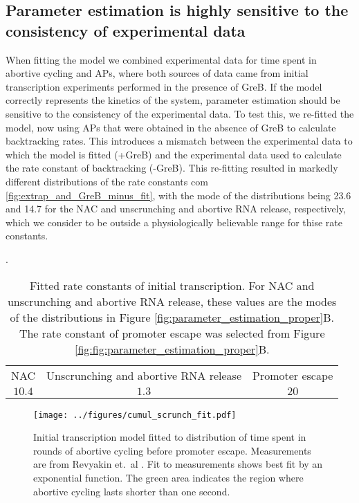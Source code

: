 \subsection{Parameter estimation is highly sensitive to the consistency of experimental data}
When fitting the model we combined experimental data for time spent
in abortive cycling and APs, where both sources of data
came from initial transcription experiments performed in the presence of GreB.
If the model correctly represents the kinetics of the system, parameter
estimation should be sensitive to the consistency of the experimental data. To
test this, we re-fitted the model, now using APs that were obtained in
the absence of GreB to calculate backtracking rates. This introduces a
mismatch between the experimental data to which the model is fitted (+GreB)
and the experimental data used to calculate the rate constant of backtracking
(-GreB). This re-fitting resulted in markedly different distributions of the 
rate constants com \ref{fig:extrap_and_GreB_minus_fit}, with the mode of the
distributions being 23.6 and 14.7 for the NAC and unscrunching and abortive
RNA release, respectively, which we consider to be outside a physiologically
believable range for thise rate constants.

\begin{table}
  \label{tab:param_fit_revyakin}
  \caption{Fitted rate constants of initial transcription. For NAC and
  unscrunching and abortive RNA release, these values are the modes of the
  distributions in Figure \ref{fig:parameter_estimation_proper}B. The rate constant of
  promoter escape was selected from Figure
\ref{fig:fig:parameter_estimation_proper}B.}.
  \begin{center}
    \begin{tabular}{ccc}
       \toprule
       NAC & Unscrunching and abortive RNA release & Promoter escape \\
       $10.4$ & $1.3$ & $20$ \\
    \end{tabular}
  \end{center}
\end{table}


\begin{figure}
    \begin{center}
      \texttt{[image: ../figures/cumul\_scrunch\_fit.pdf]}
    \end{center}
    \caption{Initial transcription model fitted to distribution of time spent
      in rounds of abortive cycling before promoter escape. Measurements are
      from Revyakin et.\ al \cite{revyakin_abortive_2006}. Fit to measurements
      shows best fit by an exponential function. The green area indicates the
      region where abortive cycling lasts shorter than one second.}
\label{fig:revyakin_fit}
\end{figure}



